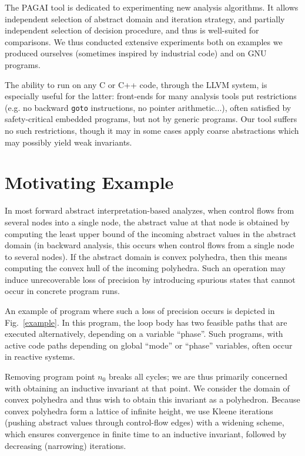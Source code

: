 \documentclass{entcs}
\begin{document}
The PAGAI tool is dedicated to experimenting new analysis algorithms.
It allows independent selection of abstract domain and iteration strategy, and partially independent selection of decision procedure, and thus is well-suited for comparisons.
We thus conducted extensive experiments both on examples we produced ourselves (sometimes inspired by industrial code) and on GNU programs.

The ability to run on any C or C++ code, through the LLVM system, is especially useful for the latter: front-ends for many analysis tools put restrictions (e.g. no backward \lstinline|goto| instructions, no pointer arithmetic...), often satisfied by safety-critical embedded programs, but not by generic programs.
Our tool suffers no such restrictions, though it may in some cases apply coarse abstractions which may possibly yield weak invariants.

\section{Motivating Example}
In most forward abstract interpretation-based analyzes, when control flows from several nodes into a single node, the abstract value at that node is obtained by computing the least upper bound of the incoming abstract values in the abstract domain (in backward analysis, this occurs when control flows from a single node to several nodes).
If the abstract domain is convex polyhedra, then this means computing the convex hull of the incoming polyhedra.
Such an operation may induce unrecoverable loss of precision by introducing spurious states that cannot occur in concrete program runs.

An example of program where such a loss of precision occurs is depicted in
Fig.~\ref{example}.
In this program, the loop body has two feasible paths that
are executed alternatively, depending on a variable ``phase''.
Such programs, with active code paths depending on global ``mode'' or ``phase'' variables, often occur in reactive systems.

Removing program point $n_0$ breaks all cycles; we are thus primarily concerned with obtaining an inductive invariant at that point.
We consider the domain of convex polyhedra and thus wish to obtain this invariant as a polyhedron.
Because convex polyhedra form a lattice of infinite height, we use Kleene iterations (pushing abstract values through control-flow edges) with a widening scheme, which ensures convergence in finite time to an inductive invariant, followed by decreasing (narrowing) iterations.
\end{document}
